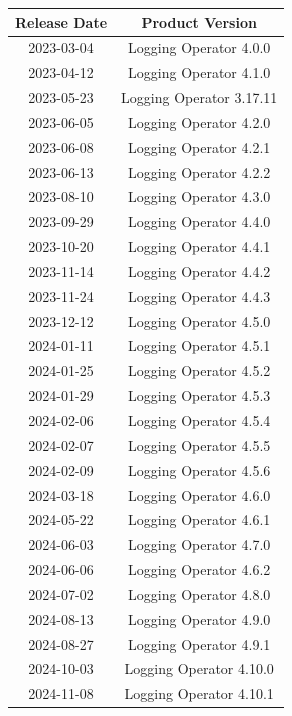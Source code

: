 \documentclass[../main.tex]{subfiles}
\begin{document}
\begin{table}[h]
    \centering
    \begin{tabular}{|c|c|}
        \hline
        \textbf{Release Date} & \textbf{Product Version} \\
        \hline
        2023-03-04 & Logging Operator 4.0.0 \\
        2023-04-12 & Logging Operator 4.1.0 \\
        2023-05-23 & Logging Operator 3.17.11 \\
        2023-06-05 & Logging Operator 4.2.0 \\
        2023-06-08 & Logging Operator 4.2.1 \\
        2023-06-13 & Logging Operator 4.2.2 \\
        2023-08-10 & Logging Operator 4.3.0 \\
        2023-09-29 & Logging Operator 4.4.0 \\
        2023-10-20 & Logging Operator 4.4.1 \\
        2023-11-14 & Logging Operator 4.4.2 \\
        2023-11-24 & Logging Operator 4.4.3 \\
        2023-12-12 & Logging Operator 4.5.0 \\
        2024-01-11 & Logging Operator 4.5.1 \\
        2024-01-25 & Logging Operator 4.5.2 \\
        2024-01-29 & Logging Operator 4.5.3 \\
        2024-02-06 & Logging Operator 4.5.4 \\
        2024-02-07 & Logging Operator 4.5.5 \\
        2024-02-09 & Logging Operator 4.5.6 \\
        2024-03-18 & Logging Operator 4.6.0 \\
        2024-05-22 & Logging Operator 4.6.1 \\
        2024-06-03 & Logging Operator 4.7.0 \\
        2024-06-06 & Logging Operator 4.6.2 \\
        2024-07-02 & Logging Operator 4.8.0 \\
        2024-08-13 & Logging Operator 4.9.0 \\
        2024-08-27 & Logging Operator 4.9.1 \\
        2024-10-03 & Logging Operator 4.10.0 \\
        2024-11-08 & Logging Operator 4.10.1 \\

\end{tabular}
\end{table}
\end{document}
